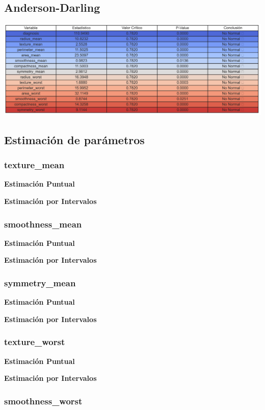 \documentclass[a4paper, 12pt]{article}
\begin{document}
\subsection*{Anderson-Darling}
\includegraphics[width=\textwidth]{../Plots/resumen_anderson_darling.png}


\subsection{Estimación de parámetros}

\subsubsection{texture\_mean}

\textbf{Estimación Puntual}

\textbf{Estimación por Intervalos}


\subsubsection{smoothness\_mean}

\textbf{Estimación Puntual}

\textbf{Estimación por Intervalos}


\subsubsection{symmetry\_mean}

\textbf{Estimación Puntual}

\textbf{Estimación por Intervalos}


\subsubsection{texture\_worst}

\textbf{Estimación Puntual}

\textbf{Estimación por Intervalos}


\subsubsection{smoothness\_worst}
\end{document}
